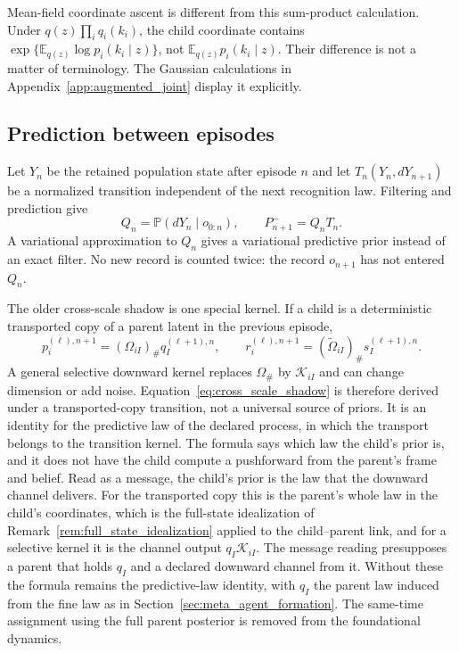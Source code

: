 Mean-field coordinate ascent is different from this sum-product calculation. Under $q(z)\prod_iq_i(k_i)$, the child coordinate contains
$\exp\{\mathbb E_{q(z)}\log p_i(k_i\mid z)\}$, not
$\mathbb E_{q(z)}p_i(k_i\mid z)$. Their difference is not a matter of terminology. The Gaussian calculations in Appendix~\ref{app:augmented_joint} display it explicitly.

\subsection{Prediction between episodes}
Let $Y_n$ be the retained population state after episode $n$ and let $T_n(Y_n,dY_{n+1})$ be a normalized transition independent of the next recognition law. Filtering and prediction give
\begin{equation}
Q_n=\mathbb P(dY_n\mid o_{0:n}),\qquad
P_{n+1}^{-}=Q_nT_n.
\label{eq:predictive_prior}
\end{equation}
A variational approximation to $Q_n$ gives a variational predictive prior instead of an exact filter. No new record is counted twice: the record $o_{n+1}$ has not entered $Q_n$.

The older cross-scale shadow is one special kernel. If a child is a deterministic transported copy of a parent latent in the previous episode,
\begin{equation}
p_i^{(\ell),n+1}=(\Omega_{iI})_\#q_I^{(\ell+1),n},
\qquad
r_i^{(\ell),n+1}=(\widetilde\Omega_{iI})_\#s_I^{(\ell+1),n}.
\label{eq:cross_scale_shadow}
\end{equation}
A general selective downward kernel replaces $\Omega_\#$ by $\mathcal K_{iI}$ and can change dimension or add noise. Equation~\eqref{eq:cross_scale_shadow} is therefore derived under a transported-copy transition, not a universal source of priors. It is an identity for the predictive law of the declared process, in which the transport belongs to the transition kernel. The formula says which law the child's prior is, and it does not have the child compute a pushforward from the parent's frame and belief. Read as a message, the child's prior is the law that the downward channel delivers. For the transported copy this is the parent's whole law in the child's coordinates, which is the full-state idealization of Remark~\ref{rem:full_state_idealization} applied to the child--parent link, and for a selective kernel it is the channel output $q_I\mathcal K_{iI}$. The message reading presupposes a parent that holds $q_I$ and a declared downward channel from it. Without these the formula remains the predictive-law identity, with $q_I$ the parent law induced from the fine law as in Section~\ref{sec:meta_agent_formation}. The same-time assignment using the full parent posterior is removed from the foundational dynamics.

